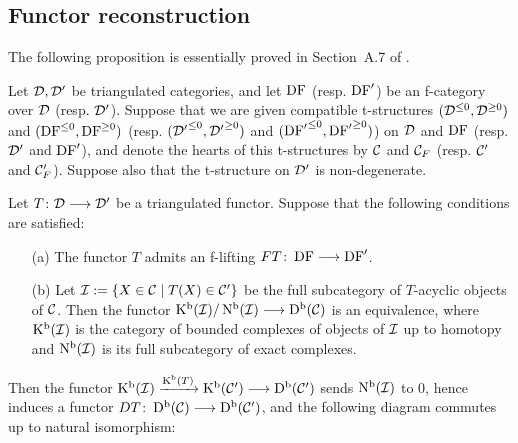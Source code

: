 \subsection{Functor reconstruction}

The following proposition is essentially proved in Section~A.7 of \cite{Be1} .

\begin{proposition} 
Let $\Df,\Df'$ be triangulated categories, and let $\DF$ (resp. $\DF'$) be an f-category over $\Df$ (resp. $\Df'$).
Suppose that we are given compatible t-structures $(\Df^{\leq 0},\Df^{\geq 0})$ and $(\DF^{\leq 0},\DF^{\geq 0})$ (resp. $({\Df'}^{\leq 0},{\Df'}^{\geq 0})$
and $({\DF'}^{\leq 0},{\DF'}^{\geq 0})$) on $\Df$ and $\DF$ (resp. $\Df'$ and $\DF'$), and denote the hearts of this t-structures 
by $\Cf$ and $\Cf_F$ (resp. $\Cf'$ and $\Cf'_F$). Suppose also that the t-structure on $\Df'$ is non-degenerate.

Let $T\colon \Df\ra\Df'$ be a triangulated functor. Suppose that the following conditions are satisfied:
\begin{itemize}
\item[(a)] The functor $T$ admits an f-lifting $FT\colon \DF\ra\DF'$.

\item[(b)] Let $\If:=\{X\in\Cf\mid T(X)\in\Cf'\}$ be the full subcategory of $T$-acyclic objects of $\Cf$. Then the functor
$\Kb(\If)/\Nb(\If)\ra\Db(\Cf)$ is an equivalence, where $\Kb(\If)$ is the category of bounded complexes of objects of $\If$ up to
homotopy and $\Nb(\If)$ is its full subcategory of exact complexes.

\end{itemize}

Then the functor $\Kb(\If)\xra{\Kb(T)}\Kb(\Cf')\ra\Db(\Cf')$ sends $\Nb(\If)$ to $0$, hence induces a functor
$DT\colon \Db(\Cf)\ra\Db(\Cf')$, and the following diagram commutes up to natural isomorphism:

\label{prop_der_fil}
\end{proposition}

